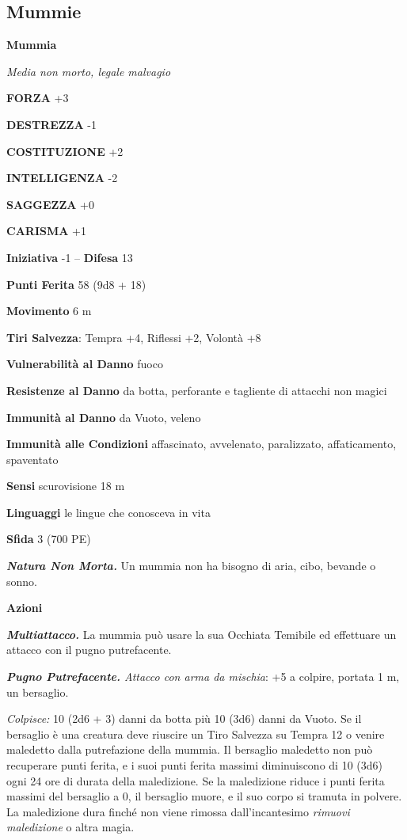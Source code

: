 \begin{multicols}{2}
\subsection{Mummie}

\medskip{}\textbf{Mummia}

\emph{Media non morto, legale malvagio}

\textbf{FORZA} +3

\textbf{DESTREZZA} -1

\textbf{COSTITUZIONE} +2

\textbf{INTELLIGENZA} -2

\textbf{SAGGEZZA} +0

\textbf{CARISMA} +1

\textbf{Iniziativa} -1 -- \textbf{Difesa} 13

\textbf{Punti Ferita} 58 (9d8 + 18)

\textbf{Movimento} 6 m

\textbf{Tiri Salvezza}: Tempra +4, Riflessi +2, Volontà +8

\textbf{Vulnerabilità al Danno} fuoco

\textbf{Resistenze al Danno} da botta, perforante e tagliente di attacchi non magici

\textbf{Immunità al Danno} da Vuoto, veleno

\textbf{Immunità alle Condizioni} affascinato, avvelenato, paralizzato, affaticamento, spaventato

\textbf{Sensi} scurovisione 18 m 

\textbf{Linguaggi} le lingue che conosceva in vita

\textbf{Sfida} 3 (700 PE)

\emph{\textbf{Natura Non Morta.}} Un mummia non ha bisogno di aria, cibo, bevande o sonno.

\textbf{Azioni}

\emph{\textbf{Multiattacco.}} La mummia può usare la sua Occhiata Temibile ed effettuare un attacco con il pugno putrefacente.

\emph{\textbf{Pugno Putrefacente.} Attacco con arma da mischia}: +5 a colpire, portata 1 m, un bersaglio.

\emph{Colpisce:} 10 (2d6 + 3) danni da botta più 10 (3d6) danni da Vuoto. Se il bersaglio è una creatura deve riuscire un Tiro Salvezza su Tempra 12 o venire maledetto dalla putrefazione della mummia. Il bersaglio maledetto non può recuperare punti ferita, e i suoi punti ferita massimi diminuiscono di 10 (3d6) ogni 24 ore di durata della maledizione. Se la maledizione riduce i punti ferita massimi del bersaglio a 0, il bersaglio muore, e il suo corpo si tramuta in polvere. La maledizione dura finché non viene rimossa dall'incantesimo \emph{rimuovi maledizione} o altra magia.


\end{multicols}
